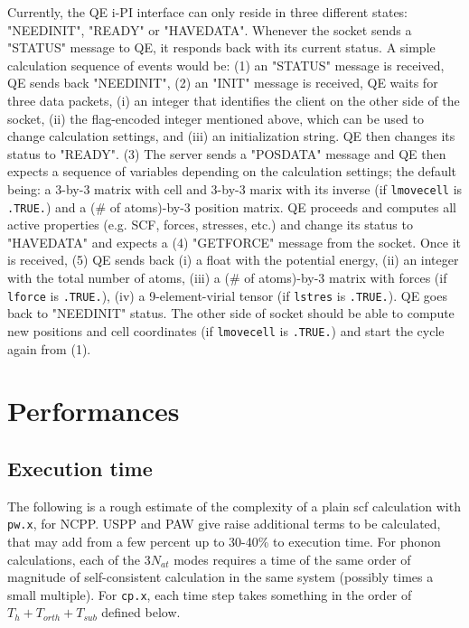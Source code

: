 \documentclass[12pt,a4paper]{article}
\def\pwx{\texttt{pw.x}}
\def\cpx{\texttt{cp.x}}
\begin{document}
Currently, the QE i-PI interface can only reside in
three different states: "NEEDINIT", "READY" or "HAVEDATA". Whenever 
the socket sends a "STATUS" message to QE, it responds back with its 
current status. A simple calculation sequence of events would be: (1) an
"STATUS" message is received, QE sends back "NEEDINIT", (2) an "INIT"
message is received, QE waits for three data packets, (i) an integer
that identifies the client on the other side of the socket, (ii) the flag-encoded integer
mentioned above, which can be used to change calculation 
settings, and (iii) an initialization string. QE then changes its status
to "READY". (3) The server sends a "POSDATA" message and QE then expects 
a sequence of variables depending on the calculation settings; the default 
being: a 3-by-3 matrix with cell and 3-by-3 marix with its inverse (if 
\verb#lmovecell# is \verb#.TRUE.#) and a (# of atoms)-by-3 position matrix. QE 
proceeds and computes all active properties (e.g. SCF, forces, stresses, 
etc.) and change its status to "HAVEDATA" and expects a (4) "GETFORCE"
message from the socket. Once it is received, (5) QE sends back (i) a
float with the potential energy, (ii) an integer with the total number of
atoms, (iii) a (# of atoms)-by-3 matrix with forces (if \verb#lforce# is
\verb#.TRUE.#), (iv) a 9-element-virial tensor (if \verb#lstres# is
\verb#.TRUE.#). QE goes back to "NEEDINIT" status. The other side of socket
should be able to compute new positions and cell coordinates (if \verb#lmovecell#
is \verb#.TRUE.#) and start the cycle again from (1).

\section{Performances}

\subsection{Execution time}

The following is a rough estimate of the complexity of a plain
scf calculation with \pwx, for NCPP. USPP and PAW 
give raise additional terms to be calculated, that may add from a 
few percent 
up to 30-40\% to execution time. For phonon calculations, each of the
$3N_{at}$ modes requires a time of the same order of magnitude of
self-consistent calculation in the same system (possibly times a small multiple). 
For \cpx, each time step takes something in the order of
$T_h + T_{orth} + T_{sub}$ defined below.
\end{document}
